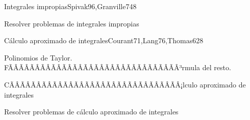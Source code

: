 \begin{sumilla}
\begin{unit}{Integrales impropias}{Spivak96,Granville74}{8}
\begin{objetivos}
	\item Resolver problemas de integrales impropias
\end{objetivos}
\end{unit}

\begin{unit}{C\'alculo aproximado de integrales}{Courant71,Lang76,Thomas62}{8}
\begin{topicos}
      \item Polinomios de Taylor. FÃÂÃÂÃÂÃÂÃÂÃÂÃÂÃÂÃÂÃÂÃÂÃÂÃÂÃÂÃÂÃÂ³rmula del resto.
      \item CÃÂÃÂÃÂÃÂÃÂÃÂÃÂÃÂÃÂÃÂÃÂÃÂÃÂÃÂÃÂÃÂ¡lculo aproximado de integrales
  \end{topicos}

   \begin{objetivos}
      \item Resolver problemas de c\'alculo aproximado de integrales
   \end{objetivos}
\end{unit}

\begin{bibliografia}
\end{bibliografia}
\end{sumilla}
